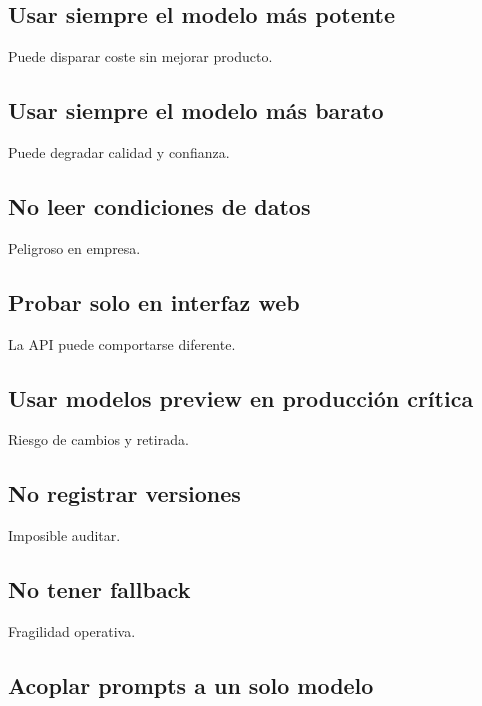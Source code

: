 \subsection{Usar siempre el modelo más
potente}\label{usar-siempre-el-modelo-muxe1s-potente}

Puede disparar coste sin mejorar producto.

\subsection{Usar siempre el modelo más
barato}\label{usar-siempre-el-modelo-muxe1s-barato}

Puede degradar calidad y confianza.

\subsection{No leer condiciones de
datos}\label{no-leer-condiciones-de-datos}

Peligroso en empresa.

\subsection{Probar solo en interfaz
web}\label{probar-solo-en-interfaz-web}

La API puede comportarse diferente.

\subsection{Usar modelos preview en producción
crítica}\label{usar-modelos-preview-en-producciuxf3n-cruxedtica}

Riesgo de cambios y retirada.

\subsection{No registrar versiones}\label{no-registrar-versiones}

Imposible auditar.

\subsection{No tener fallback}\label{no-tener-fallback}

Fragilidad operativa.

\subsection{Acoplar prompts a un solo
modelo}\label{acoplar-prompts-a-un-solo-modelo}

